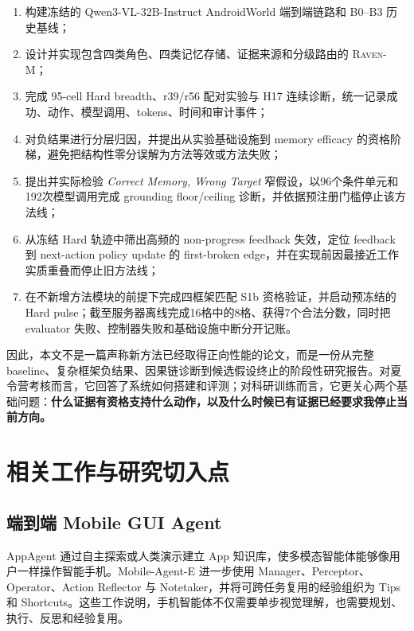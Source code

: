 \documentclass[12pt,a4paper]{ctexart}
\newcommand{\ravenm}{\textsc{Raven-M}}
\begin{document}
\begin{enumerate}[leftmargin=2em]
    \item 构建冻结的 Qwen3-VL-32B-Instruct AndroidWorld 端到端链路和 B0--B3 历史基线；
    \item 设计并实现包含四类角色、四类记忆存储、证据来源和分级路由的 \ravenm{}；
    \item 完成 95-cell Hard breadth、r39/r56 配对实验与 H17 连续诊断，统一记录成功、动作、模型调用、tokens、时间和审计事件；
    \item 对负结果进行分层归因，并提出从实验基础设施到 memory efficacy 的资格阶梯，避免把结构性零分误解为方法等效或方法失败；
    \item 提出并实际检验 \textit{Correct Memory, Wrong Target} 窄假设，以96个条件单元和192次模型调用完成 grounding floor/ceiling 诊断，并依据预注册门槛停止该方法线；
    \item 从冻结 Hard 轨迹中筛出高频的 non-progress feedback 失效，定位 feedback 到 next-action policy update 的 first-broken edge，并在实现前因最接近工作实质重叠而停止旧方法线；
    \item 在不新增方法模块的前提下完成四框架匹配 S1b 资格验证，并启动预冻结的 Hard pulse；截至服务器离线完成16格中的8格、获得7个合法分数，同时把 evaluator 失败、控制器失败和基础设施中断分开记账。
\end{enumerate}

因此，本文不是一篇声称新方法已经取得正向性能的论文，而是一份从完整 baseline、复杂框架负结果、因果链诊断到候选假设终止的阶段性研究报告。对夏令营考核而言，它回答了系统如何搭建和评测；对科研训练而言，它更关心两个基础问题：\textbf{什么证据有资格支持什么动作，以及什么时候已有证据已经要求我停止当前方向。}

\section{相关工作与研究切入点}

\subsection{端到端 Mobile GUI Agent}

AppAgent 通过自主探索或人类演示建立 App 知识库，使多模态智能体能够像用户一样操作智能手机\cite{appagent}。Mobile-Agent-E 进一步使用 Manager、Perceptor、Operator、Action Reflector 与 Notetaker，并将可跨任务复用的经验组织为 Tips 和 Shortcuts\cite{mobileagente}。这些工作说明，手机智能体不仅需要单步视觉理解，也需要规划、执行、反思和经验复用。
\end{document}
